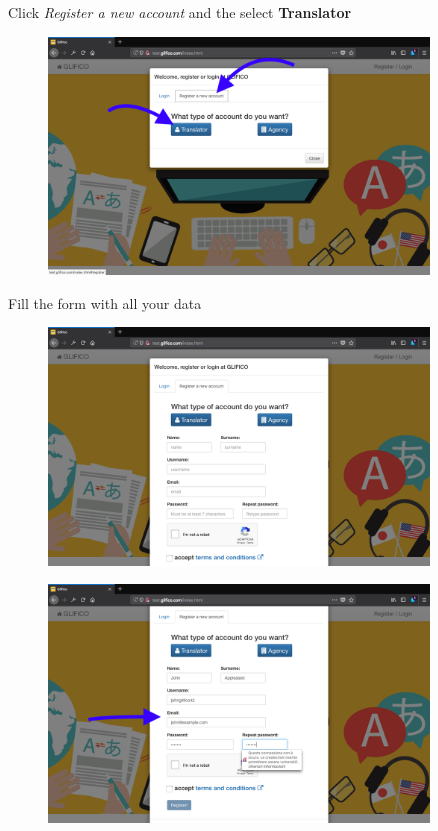 \documentclass[11 pt, a4paper]{article}
\begin{document}
Click \textit{Register a new account} and the select \textbf{Translator}
\begin{figure}[H]
\centering
\includegraphics[width=0.9\textwidth]{translator_register1.png}
\end{figure}

\clearpage
Fill the form with all your data
\begin{figure}[H]
\centering
\includegraphics[width=0.9\textwidth]{translator_register2.png}
\end{figure}

\begin{figure}[H]
\centering
\includegraphics[width=0.9\textwidth]{translator_register3.png}
\end{figure}
\end{document}
